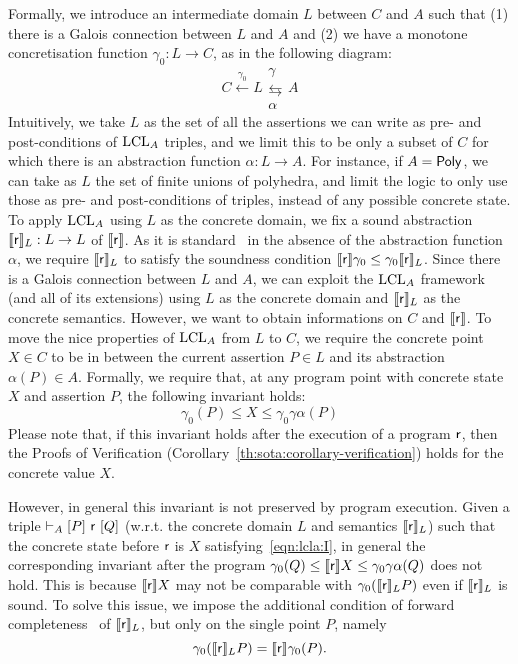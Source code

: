 Formally, we introduce an intermediate domain $L$ between $C$ and $A$ such that (1) there is a Galois connection between $L$ and $A$ and (2) we have a monotone concretisation function $\gamma_0 : L \rightarrow C$, as in the following diagram:
\[
C \xleftarrow{\gamma_0} L \mathrel{\substack{\gamma \\ \leftrightarrows \\ \alpha}} A
\]
Intuitively, we take $L$ as the set of all the assertions we can write as pre- and post-conditions of $\text{LCL}_A$ triples, and we limit this to be only a subset of $C$ for which there is an abstraction function $\alpha : L \rightarrow A$. For instance, if $A = \mathsf{Poly}$, we can take as $L$ the set of finite unions of polyhedra, and limit the logic to only use those as pre- and post-conditions of triples, instead of any possible concrete state.
To apply $\text{LCL}_A$ using $L$ as the concrete domain, we fix a sound abstraction $\llbracket\mathsf{r}\rrbracket_L : L \rightarrow L$ of $\llbracket\mathsf{r}\rrbracket$. As it is standard~\cite{CC92} in the absence of the abstraction function $\alpha$, we require $\llbracket\mathsf{r}\rrbracket_L$ to satisfy the soundness condition $\llbracket\mathsf{r}\rrbracket \gamma_0 \le \gamma_0 \llbracket\mathsf{r}\rrbracket_L$.
Since there is a Galois connection between $L$ and $A$, we can exploit the $\text{LCL}_A$ framework (and all of its extensions) using $L$ as the concrete domain and $\llbracket\mathsf{r}\rrbracket_L$ as the concrete semantics. However, we want to obtain informations on $C$ and $\llbracket\mathsf{r}\rrbracket$. To move the nice properties of $\text{LCL}_A$ from $L$ to $C$, we require the concrete point $X \in C$ to be in between the current assertion $P \in L$ and its abstraction $\alpha(P) \in A$. Formally, we require that, at any program point with concrete state $X$ and assertion $P$, the following invariant holds:
\begin{equation*}\label{eqn:lcla:I}
	\gamma_0(P) \le X \le \gamma_0\gamma\alpha(P) \tag{I}
\end{equation*}
Please note that, if this invariant holds after the execution of a program $\mathsf{r}$, then the Proofs of Verification (Corollary~\ref{th:sota:corollary-verification}) holds for the concrete value $X$.

However, in general this invariant is not preserved by program execution. Given a triple $\vdash_{A}\nobreak[P]~\mathsf{r}~[Q]$ (w.r.t. the concrete domain $L$ and semantics $\llbracket\mathsf{r}\rrbracket_L$) such that the concrete state before $\mathsf{r}$ is $X$ satisfying~\eqref{eqn:lcla:I}, in general the corresponding invariant after the program $\gamma_0(Q) \le \llbracket\mathsf{r}\rrbracket X \le \gamma_0\gamma\alpha(Q)$ does not hold. This is because $\llbracket\mathsf{r}\rrbracket X$ may not be comparable with $\gamma_0 (\llbracket\mathsf{r}\rrbracket_L P)$ even if $\llbracket\mathsf{r}\rrbracket_L$ is sound. To solve this issue, we impose the additional condition of forward completeness~\cite{GQ01} of $\llbracket\mathsf{r}\rrbracket_L$, but only on the single point $P$, namely
\[
\gamma_0(\llbracket\mathsf{r}\rrbracket_L P) = \llbracket\mathsf{r}\rrbracket \gamma_0(P) .
\]


